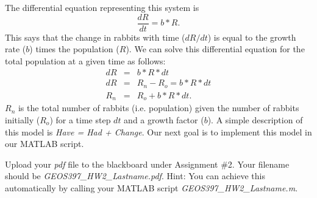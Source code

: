 \documentclass[10pt]{article}
\begin{document}
The differential equation representing this system is 
\begin{equation}
	\frac{dR}{dt} = b*R.
	\label{eqn:diffEQ}
\end{equation}
This says that the change in rabbits with time ($dR/dt$) is equal to the growth rate ($b$) times the population ($R$). We can solve this differential equation for the total population at a given time as follows:
\begin{eqnarray}
	dR &=& b*R*dt \\
	dR &=& R_n-R_o = b*R*dt \\
	R_n &=& R_o + b*R*dt.
\end{eqnarray}
$R_n$ is the total number of rabbits (i.e. population) given the number of rabbits initially ($R_o$) for a time step $dt$ and a growth factor ($b$). A simple description of this model is \textit{Have = Had + Change}. Our next goal is to implement this model in our MATLAB script.



\vfill

Upload your \textit{pdf} file to the blackboard under Assignment \#2. Your filename should be \textit{GEOS397\_HW2\_Lastname.pdf}. Hint: You can achieve this automatically by calling your MATLAB script \textit{GEOS397\_HW2\_Lastname.m}.
\end{document}
